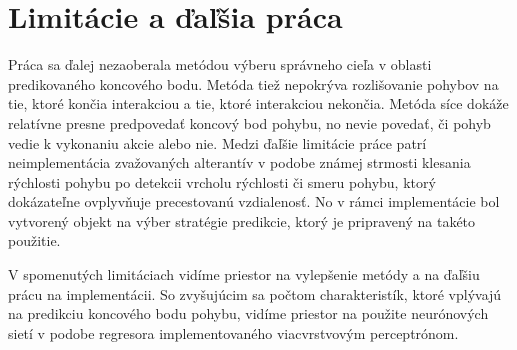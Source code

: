 \section{Limitácie a ďaľšia práca}
Práca sa ďalej nezaoberala metódou výberu správneho cieľa v oblasti predikovaného koncového bodu. Metóda tiež nepokrýva rozlišovanie pohybov na tie, ktoré končia interakciou a tie, ktoré interakciou nekončia. Metóda síce dokáže relatívne presne predpovedať koncový bod pohybu, no nevie povedať, či pohyb vedie k vykonaniu akcie alebo nie. Medzi ďaľšie limitácie práce patrí neimplementácia zvažovaných alterantív v podobe známej strmosti klesania rýchlosti pohybu po detekcii vrcholu rýchlosti či smeru pohybu, ktorý dokázateľne ovplyvňuje precestovanú vzdialenosť. No v rámci implementácie bol vytvorený objekt na výber stratégie predikcie, ktorý je pripravený na takéto použitie.

V spomenutých limitáciach vidíme priestor na vylepšenie metódy a na ďaľšiu prácu na implementácii. So zvyšujúcim sa počtom charakteristík, ktoré vplývajú na predikciu koncového bodu pohybu, vidíme priestor na použite neurónových sietí v podobe regresora implementovaného viacvrstvovým perceptrónom.